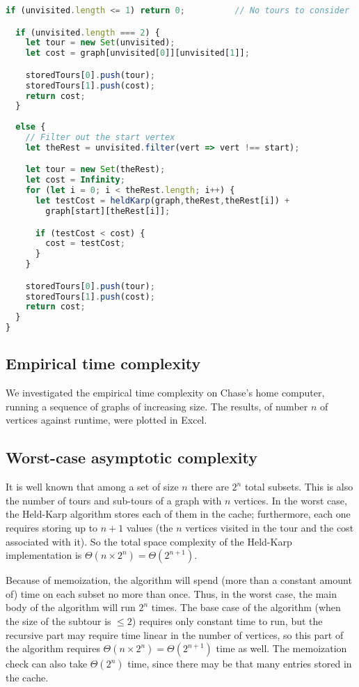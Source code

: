 \documentclass[10pt]{extarticle}
\begin{document}
\begin{lstlisting}[language=JavaScript]
  if (unvisited.length <= 1) return 0;          // No tours to consider

  if (unvisited.length === 2) {
    let tour = new Set(unvisited);
    let cost = graph[unvisited[0]][unvisited[1]];

    storedTours[0].push(tour);
    storedTours[1].push(cost);
    return cost;
  } 
  
  else {
    // Filter out the start vertex
    let theRest = unvisited.filter(vert => vert !== start);

    let tour = new Set(theRest);
    let cost = Infinity;
    for (let i = 0; i < theRest.length; i++) {
      let testCost = heldKarp(graph,theRest,theRest[i]) + 
        graph[start][theRest[i]];

      if (testCost < cost) {
        cost = testCost;
      }
    }

    storedTours[0].push(tour);
    storedTours[1].push(cost);
    return cost;
  }
}
\end{lstlisting}


\subsection{Empirical time complexity}
We investigated the empirical time complexity on Chase's home computer,
running a sequence of graphs of increasing size. The results, of number
$n$ of vertices against runtime, were plotted in Excel.


\subsection{Worst-case asymptotic complexity}
It is well known that among a set of size $n$ there are $2^n$ total subsets.
This is also the number of tours and sub-tours of a graph with $n$ vertices.
In the worst case, the Held-Karp algorithm stores each of them in the cache;
furthermore, each one requires storing up to $n+1$ values (the $n$ vertices
visited in the tour and the cost associated with it). So the total space
complexity of the Held-Karp implementation is $\Theta(n \times 2^n) = 
\Theta(2^{n+1})$.

Because of memoization, the algorithm will spend (more than a constant amount 
of) time on each subset no more than once. Thus, in the worst case, the main
body of the algorithm will run $2^n$ times. The base case of the algorithm
(when the size of the subtour is $\leq 2$) requires only constant time to run,
but the recursive part may require time linear in the number of vertices,
so this part of the algorithm requires $\Theta(n \times 2^n) = \Theta(2^{n+1})$
time as well. The memoization check can also take $\Theta(2^n)$ time, since
there may be that many entries stored in the cache. 
\end{document}
